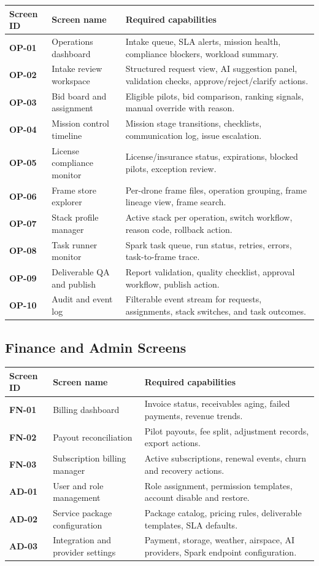 \documentclass[11pt,a4paper]{article}
\begin{document}
\begin{longtable}{>{\bfseries}p{}p{}p{}}
\toprule
Screen ID & Screen name & Required capabilities \\
\midrule
OP-01 & Operations dashboard & Intake queue, SLA alerts, mission health, compliance blockers, workload summary. \\
OP-02 & Intake review workspace & Structured request view, AI suggestion panel, validation checks, approve/reject/clarify actions. \\
OP-03 & Bid board and assignment & Eligible pilots, bid comparison, ranking signals, manual override with reason. \\
OP-04 & Mission control timeline & Mission stage transitions, checklists, communication log, issue escalation. \\
OP-05 & License compliance monitor & License/insurance status, expirations, blocked pilots, exception review. \\
OP-06 & Frame store explorer & Per-drone frame files, operation grouping, frame lineage view, frame search. \\
OP-07 & Stack profile manager & Active stack per operation, switch workflow, reason code, rollback action. \\
OP-08 & Task runner monitor & Spark task queue, run status, retries, errors, task-to-frame trace. \\
OP-09 & Deliverable QA and publish & Report validation, quality checklist, approval workflow, publish action. \\
OP-10 & Audit and event log & Filterable event stream for requests, assignments, stack switches, and task outcomes. \\
\bottomrule
\end{longtable}

\subsection{Finance and Admin Screens}

\begin{longtable}{>{\bfseries}p{}p{}p{}}
\toprule
Screen ID & Screen name & Required capabilities \\
\midrule
FN-01 & Billing dashboard & Invoice status, receivables aging, failed payments, revenue trends. \\
FN-02 & Payout reconciliation & Pilot payouts, fee split, adjustment records, export actions. \\
FN-03 & Subscription billing manager & Active subscriptions, renewal events, churn and recovery actions. \\
AD-01 & User and role management & Role assignment, permission templates, account disable and restore. \\
AD-02 & Service package configuration & Package catalog, pricing rules, deliverable templates, SLA defaults. \\
AD-03 & Integration and provider settings & Payment, storage, weather, airspace, AI providers, Spark endpoint configuration. \\
\bottomrule
\end{longtable}
\end{document}
